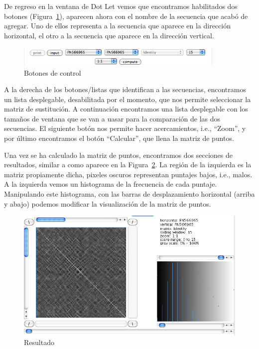 \documentclass[letter,11pt]{book}
\begin{document}
De regreso en la ventana de Dot Let vemos que encontramos habilitados dos botones (Figura~\ref{DotLetbotones}), aparecen ahora con el nombre de la secuencia que acabó de agregar. Uno de ellos representa a la secuencia que aparece en la dirección horizontal, el otro a la secuencia que aparece en la dirección vertical.

\begin{figure}[ht]
\centering
   \includegraphics[width=10cm]{Figs/DotLetBotones.png}
  \caption{\label{DotLetbotones}Botones de control}
\end{figure}

A la derecha de los botones/listas que identifican a las secuencias, encontramos un lista desplegable, desabilitada por el momento, que nos permite seleccionar la matriz de sustitución. A continuación encontramos una lista desplegable con los tamaños de ventana que se van a uasar para la comparación de las dos secuencias. El siguiente botón nos permite hacer acercamientos, i.e., ``Zoom'', y por último encontramos el botón ``Calcular'', que llena la matriz de puntos.

Una vez se ha calculado la matriz de puntos, encontramos dos secciones de resultados, similar a como aparece en la Figura~\ref{DotLetResultado1}. La región de la izquierda es la matriz propiamente dicha, pixeles oscuros representan puntajes  bajos, i.e., malos. A la izquierda vemos un histograma de la frecuencia de cada puntaje. Manipulando este histograma, con las barras de desplazamiento horizontal (arriba y abajo) podemos modificar la visualización de la matriz de puntos.

\begin{figure}[ht]
\centering
   \includegraphics[width=15cm]{Figs/DotLetResultado1.png}
  \caption{\label{DotLetResultado1}Resultado}
\end{figure}
\end{document}

